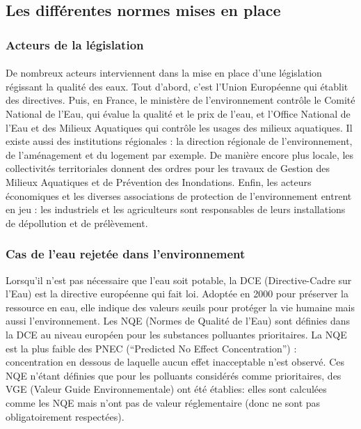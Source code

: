 \documentclass{article}
\begin{document}
\subsection{Les différentes normes mises en place}%
\subsubsection{Acteurs de la législation}

\paragraph{} De nombreux acteurs interviennent dans la mise en place d’une législation régissant la qualité des eaux. Tout d’abord, c’est l’Union Européenne qui établit des directives. Puis, en France, le  ministère de l’environnement contrôle le Comité National de l’Eau, qui évalue la qualité et le prix de l’eau, et l’Office National de l’Eau et des Milieux Aquatiques  qui contrôle les usages des milieux aquatiques. Il existe aussi des institutions régionales : la direction régionale de l’environnement, de l’aménagement et du logement par exemple. De manière encore plus locale, les collectivités territoriales donnent des ordres pour les travaux de Gestion des Milieux Aquatiques et de Prévention des Inondations. Enfin, les acteurs économiques et les diverses associations de protection de l’environnement entrent en jeu : les industriels et les agriculteurs sont responsables de leurs installations de dépollution et de prélèvement.

\subsubsection{Cas de l’eau rejetée dans l’environnement}
Lorsqu’il n’est pas nécessaire que l’eau soit potable, la DCE (Directive-Cadre sur l’Eau) est la directive européenne qui fait loi. Adoptée en 2000 pour préserver la ressource en eau, elle indique des valeurs seuils pour protéger la vie humaine mais aussi l’environnement. Les NQE (Normes de Qualité de l’Eau) sont définies dans la DCE au niveau européen pour les substances polluantes prioritaires. La NQE est la plus faible des PNEC (“Predicted No Effect Concentration”) : concentration en dessous de laquelle aucun effet inacceptable n’est observé. Ces NQE n’étant définies que pour les polluants considérés comme prioritaires, des VGE (Valeur Guide Environnementale) ont été établies: elles sont calculées comme les NQE mais n’ont pas de valeur réglementaire (donc ne sont pas obligatoirement respectées).
\end{document}
